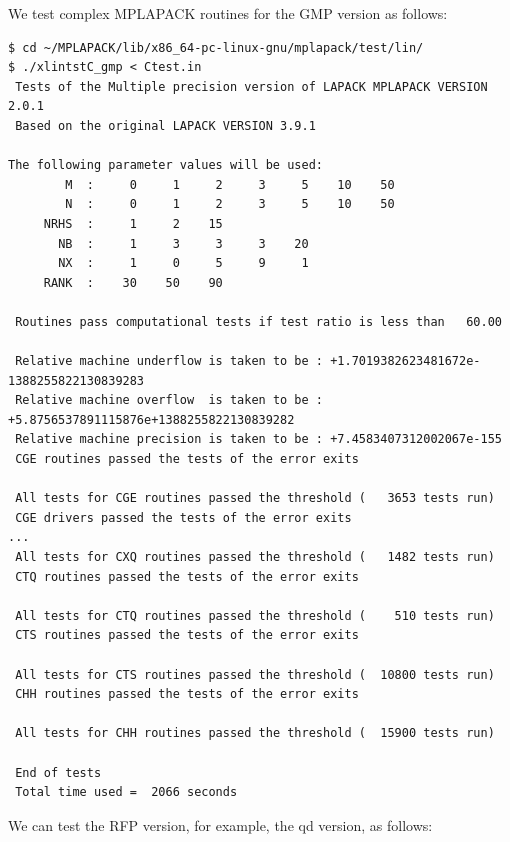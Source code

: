 \documentclass[12pt]{article}
\begin{document}
We test complex MPLAPACK routines for the GMP version as follows:
\begin{verbatim}
$ cd ~/MPLAPACK/lib/x86_64-pc-linux-gnu/mplapack/test/lin/
$ ./xlintstC_gmp < Ctest.in
 Tests of the Multiple precision version of LAPACK MPLAPACK VERSION 2.0.1
 Based on the original LAPACK VERSION 3.9.1

The following parameter values will be used:
        M  :     0     1     2     3     5    10    50
        N  :     0     1     2     3     5    10    50
     NRHS  :     1     2    15
       NB  :     1     3     3     3    20
       NX  :     1     0     5     9     1
     RANK  :    30    50    90

 Routines pass computational tests if test ratio is less than   60.00

 Relative machine underflow is taken to be : +1.7019382623481672e-1388255822130839283
 Relative machine overflow  is taken to be : +5.8756537891115876e+1388255822130839282
 Relative machine precision is taken to be : +7.4583407312002067e-155
 CGE routines passed the tests of the error exits

 All tests for CGE routines passed the threshold (   3653 tests run)
 CGE drivers passed the tests of the error exits
...
 All tests for CXQ routines passed the threshold (   1482 tests run)
 CTQ routines passed the tests of the error exits

 All tests for CTQ routines passed the threshold (    510 tests run)
 CTS routines passed the tests of the error exits

 All tests for CTS routines passed the threshold (  10800 tests run)
 CHH routines passed the tests of the error exits

 All tests for CHH routines passed the threshold (  15900 tests run)

 End of tests
 Total time used =  2066 seconds
\end{verbatim}
We can test the RFP version, for example, the qd version, as follows:
\end{document}
